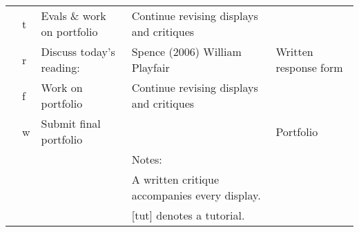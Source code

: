 \documentclass[oneside]{tufte-handout}\usepackage[]{graphicx}\usepackage[]{color}
\begin{document}
\begin{fullwidth}
\begin{table}[ht]
\begin{tabular}{>{\centering}m{3.5mm}>{\centering\sc}m{2.5mm}m{47mm}m{65mm}m{33mm}@{}}
    & t & Evals \& work on portfolio & Continue revising displays and critiques &  \\ 
    & r & Discuss today's reading: & Spence (2006) William Playfair & Written response form \\ 
    & f & Work on portfolio & Continue revising displays and critiques &  \\ 
   \midrule 11 & w & Submit final portfolio &  & Portfolio \\ 
   \bottomrule   &  &  & Notes: &  \\ 
    &  &  & A written critique accompanies every display. &  \\ 
    &  &  & [tut] denotes a tutorial. &  \\ 
  \end{tabular}
\endgroup
\end{table}

\FloatBarrier

\end{fullwidth}
\end{document}
